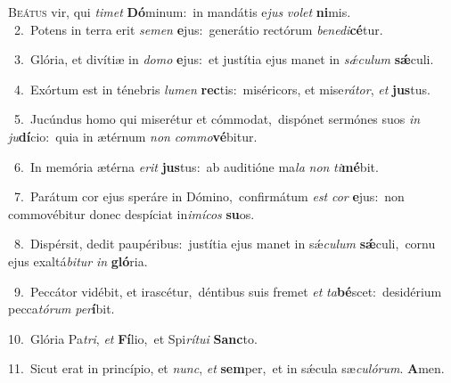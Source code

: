 \lettrine{\initial\textcolor{\initialcolor}{B}}{eátus} vir, qui \textit{ti}\-\textit{met} \textbf{Dó}\-minum:~\star in mandátis e\textit{jus} \textit{vo}\-\textit{let} \textbf{ni}\-mis.\\
{\numbfont\textcolor{\numbcolor}{~2.}}~Potens in terra erit \textit{se}\-\textit{men} \textbf{e}\-jus:~\star generátio rectórum \textit{be}\-\textit{ne}\textit{di}\textbf{cé}tur.\par
{\numbfont\textcolor{\numbcolor}{~3.}}~Glória, et divítiæ in \textit{do}\-\textit{mo} \textbf{e}\-jus:~\star et justítia ejus manet in \textit{sǽ}\-\textit{cu}\textit{lum} \textbf{sǽ}\-culi.\par
{\numbfont\textcolor{\numbcolor}{~4.}}~Exórtum est in ténebris \textit{lu}\-\textit{men} \textbf{rec}\-tis:~\star miséricors, et mise\-\textit{rá}\-\textit{tor}, \textit{et} \textbf{jus}\-tus.\par
{\numbfont\textcolor{\numbcolor}{~5.}}~Jucúndus homo qui miserétur et cómmodat,~\dagger dispónet sermónes suos \textit{in} \textit{ju}\-\textbf{dí}cio:~\star quia in ætérnum \textit{non} \textit{com}\-\textit{mo}\textbf{vé}bitur.\par
{\numbfont\textcolor{\numbcolor}{~6.}}~In memória ætérna \textit{e}\-\textit{rit} \textbf{jus}\-tus:~\star ab auditióne ma\textit{la} \textit{non} \textit{ti}\-\textbf{mé}bit.\par
{\numbfont\textcolor{\numbcolor}{~7.}}~Parátum cor ejus speráre in Dómino,~\dagger confirmátum \textit{est} \textit{cor} \textbf{e}\-jus:~\star non commovébitur donec despíciat in\-\textit{i}\-\textit{mí}\textit{cos} \textbf{su}\-os.\par
{\numbfont\textcolor{\numbcolor}{~8.}}~Dispérsit, dedit paupéribus:~\dagger justítia ejus manet in sǽ\-\textit{cu}\-\textit{lum} \textbf{sǽ}\-culi,~\star cornu ejus exaltá\-\textit{bi}\-\textit{tur} \textit{in} \textbf{gló}\-ria.\par
{\numbfont\textcolor{\numbcolor}{~9.}}~Peccátor vidébit, et irascétur,~\dagger déntibus suis fremet \textit{et} \textit{ta}\-\textbf{bé}scet:~\star desidérium pecca\-\textit{tó}\-\textit{rum} \textit{per}\-\textbf{í}bit.\par
{\numbfont\textcolor{\numbcolor}{10.}}~Glória Pa\-\textit{tri}\-, \textit{et} \textbf{Fí}\-lio,~\star et Spi\-\textit{rí}\-\textit{tu}\textit{i} \textbf{Sanc}\-to.\par
{\numbfont\textcolor{\numbcolor}{11.}}~Sicut erat in princípio, et \textit{nunc}\-, \textit{et} \textbf{sem}\-per,~\star et in sǽcula sæ\-\textit{cu}\-\textit{ló}\textit{rum}. \textbf{A}\-men.\par
